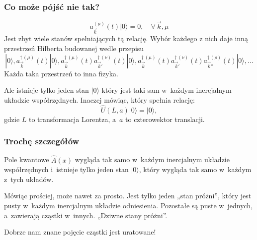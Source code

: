\documentclass[10pt,t]{beamer}
\begin{document}
\begin{frame}
  \frametitle{Co może pójść nie tak?}


  \begin{equation}
    \label{eq:Czemu-rozwazanie-08}
    a_{ \vec{ k } }^{ ( \mu ) }( t ) | 0 \rangle = 0, \quad
    \forall \, \vec{ k }, \mu
  \end{equation}
  Jest zbyt wiele stanów spełniających tą relację. Wybór każdego z
  nich daje inną przestrzeń Hilberta budowanej wedle przepisu
  \begin{equation}
    \label{eq:Czemu-rozwazanie-09}
    | 0 \rangle,
    a^{ \dagger \, ( \mu ) }_{ \vec{ k } }( t ) | 0 \rangle,
    a^{ \dagger \, ( \mu ) }_{ \vec{ k } }( t ) a^{ \dagger \, ( \nu ) }_{ \vec{ k }' }( t )
    | 0 \rangle,
    a^{ \dagger \, ( \mu ) }_{ \vec{ k } }( t ) a^{ \dagger \, ( \nu ) }_{ \vec{ k }' }( t )
    a^{ \dagger \, ( \rho ) }_{ \vec{ k }'' }( t ) | 0 \rangle, \ldots
  \end{equation}
  Każda taka przestrzeń to inna fizyka.

  Ale istnieje tylko \alert{jeden} stan $| 0 \rangle$ który jest taki sam
  w~każdym inercjalnym układzie współrzędnych. Inaczej mówiąc, który
  spełnia relację:
  \begin{equation}
    \label{eq:Czemu-rozwazanie-10}
    \widehat{U}( L, a ) | 0 \rangle = | 0 \rangle,
  \end{equation}
  gdzie $L$ to transformacja Lorentza, a~$a$ to czterowektor
  translacji.

\end{frame}





\begin{frame}
  \frametitle{Trochę szczegółów}


  Pole kwantowe $\widehat{A}( x )$ wygląda tak samo w~każdym
  inercjalnym układzie współrzędnych i~istnieje tylko jeden stan
  $| 0 \rangle$, który wygląda tak samo w~każdym z~tych układów.

  Mówiąc prościej, może nawet za prosto. Jest tylko jeden „stan
  próżni”, który jest pusty w~\alert{każdym} inercjalnym układzie
  odniesienia. Pozostałe są puste w~jednych, a~zawierają cząstki
  w~innych. „Dziwne stany próżni”.

  Dobrze nam znane pojęcie cząstki jest uratowane!

\end{frame}
\end{document}
